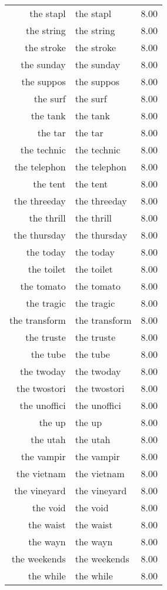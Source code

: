 \begin{table}[ht]
\begin{tabular}{rlr}
  the stapl & the stapl & 8.00 \\ 
  the string & the string & 8.00 \\ 
  the stroke & the stroke & 8.00 \\ 
  the sunday & the sunday & 8.00 \\ 
  the suppos & the suppos & 8.00 \\ 
  the surf & the surf & 8.00 \\ 
  the tank & the tank & 8.00 \\ 
  the tar & the tar & 8.00 \\ 
  the technic & the technic & 8.00 \\ 
  the telephon & the telephon & 8.00 \\ 
  the tent & the tent & 8.00 \\ 
  the threeday & the threeday & 8.00 \\ 
  the thrill & the thrill & 8.00 \\ 
  the thursday & the thursday & 8.00 \\ 
  the today & the today & 8.00 \\ 
  the toilet & the toilet & 8.00 \\ 
  the tomato & the tomato & 8.00 \\ 
  the tragic & the tragic & 8.00 \\ 
  the transform & the transform & 8.00 \\ 
  the truste & the truste & 8.00 \\ 
  the tube & the tube & 8.00 \\ 
  the twoday & the twoday & 8.00 \\ 
  the twostori & the twostori & 8.00 \\ 
  the unoffici & the unoffici & 8.00 \\ 
  the up & the up & 8.00 \\ 
  the utah & the utah & 8.00 \\ 
  the vampir & the vampir & 8.00 \\ 
  the vietnam & the vietnam & 8.00 \\ 
  the vineyard & the vineyard & 8.00 \\ 
  the void & the void & 8.00 \\ 
  the waist & the waist & 8.00 \\ 
  the wayn & the wayn & 8.00 \\ 
  the weekends & the weekends & 8.00 \\ 
  the while & the while & 8.00 \\ 

\end{tabular}
\end{table}
